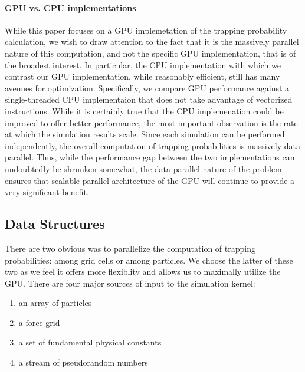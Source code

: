 \paragraph{GPU vs. CPU implementations}
While this paper focuses on a GPU implemetation of the trapping
probability calculation, we wish to draw attention to the fact that it
is the massively parallel nature of this computation, and not the
specific GPU implementation, that is of the broadest interest.  In
particular, the CPU implementation with which we contrast our GPU
implementation, while reasonably efficient, still has many avenues for
optimization.  Specifically, we compare GPU performance against a
single-threaded CPU implementaion that does not take advantage of
vectorized instructions.  While it is certainly true that the CPU
implemenation could be improved to offer better performance, the most
important observation is the rate at which the simulation results
scale.  Since each simulation can be performed independently, the
overall computation of trapping probabilities is massively data
parallel.  Thus, while the performance gap between the two
implementations can undoubtedly be shrunken somewhat, the
data-parallel nature of the problem ensures that scalable parallel
architecture of the GPU will continue to provide a very significant
benefit.

\subsection{Data Structures}
\label{sec:data-structures}

There are two obvious was to parallelize the computation of trapping
probabilities: among grid cells or among particles.  We choose the
latter of these two as we feel it offers more flexiblity and
allows us to maximally utilize the GPU.  There are four major sources
of input to the simulation kernel:

\begin{enumerate}
\item an array of particles
\item a force grid
\item a set of fundamental physical constants
\item a stream of pseudorandom numbers
\end{enumerate}

